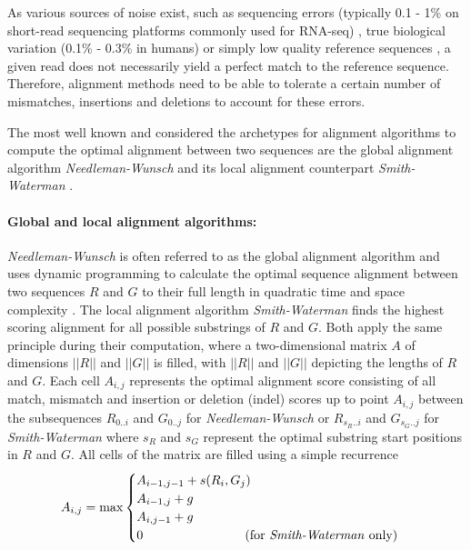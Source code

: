  As various sources of noise exist, such as sequencing errors (typically 0.1 - 1\% on short-read sequencing platforms commonly used for RNA-seq) \citep{Nielsen2011GenotypeData}, true biological variation (0.1\% - 0.3\% in humans) \citep{Mahmoud2019StructuralIt} or simply low quality reference sequences \citep{Rhie2021TowardsSpecies}, a given read does not necessarily yield a perfect match to the reference sequence. Therefore, alignment methods need to be able to tolerate a certain number of mismatches, insertions and deletions to account for these errors.
 
 The most well known and considered the archetypes for alignment algorithms to compute the optimal alignment between two sequences are the global alignment algorithm \textit{Needleman-Wunsch} \citep{Needleman1970} and its local alignment counterpart \textit{Smith-Waterman} \citep{Smith1981}.
 
\paragraph{Global and local alignment algorithms:} \textit{Needleman-Wunsch} is often referred to as the global alignment algorithm and uses dynamic programming to calculate the optimal sequence alignment between two sequences $R$ and $G$ to their full length in quadratic time and space complexity \citep{Gusfield:1997:AST:262228}. The local alignment algorithm \textit{Smith-Waterman} finds the highest scoring alignment for all possible substrings of $R$ and $G$. Both apply the same principle during their computation, where a two-dimensional matrix $A$ of dimensions $||R||$ and $||G||$ is filled, with $||R||$ and $||G||$ depicting the lengths of $R$ and $G$. Each cell $A_{i,j}$ represents the optimal alignment score consisting of all match, mismatch and insertion or deletion (indel) scores up to point $A_{i,j}$ between the subsequences $R_{0..i}$ and $G_{0..j}$ for \textit{Needleman-Wunsch} or $R_{s_{R}..i}$ and $G_{s_{G}..j}$ for \textit{Smith-Waterman} where $s_{R}$ and $s_{G}$ represent the optimal substring start positions in $R$ and $G$. All cells of the matrix are filled using a simple recurrence
$$
A_{i,j} = \max
\begin{cases}
    A_{i-1,j-1}+s(R_i,G_j)\\
    A_{i-1,j}+g\\
    A_{i,j-1}+g\\
    0 \text{\hspace{8em}(for \textit{Smith-Waterman} only)} \\
\end{cases}
$$


